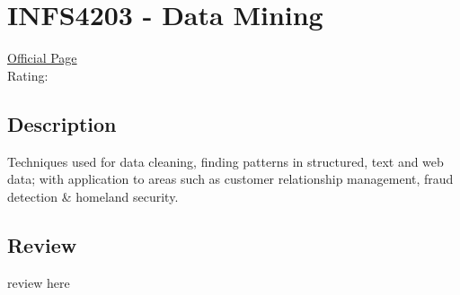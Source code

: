 \hypertarget{INFS4203}{\section{INFS4203 - Data Mining}}

\large
\textcolor{turbo_purple}{\href{https://my.uq.edu.au/programs-courses/course.html?course_code=INFS4203}{Official Page}} \\
Rating: \cstar\cstar\cstar\cstar\ostar

\normalsize
\subsection*{Description}
Techniques used for data cleaning, finding patterns in structured, text and web data; with application to areas such as customer relationship management, fraud detection \& homeland security.

\subsection*{Review}
review here
